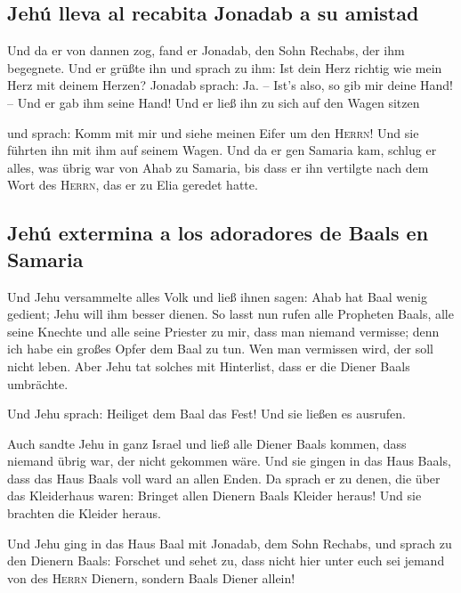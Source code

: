 \hypertarget{jehuxfa-lleva-al-recabita-jonadab-a-su-amistad}{%
\subsection{Jehú lleva al recabita Jonadab a su
amistad}\label{jehuxfa-lleva-al-recabita-jonadab-a-su-amistad}}

 Und da er von dannen zog, fand er Jonadab, den Sohn
Rechabs, der ihm begegnete. Und er grüßte ihn und sprach zu ihm: Ist
dein Herz richtig wie mein Herz mit deinem Herzen? Jonadab sprach: Ja.
-- Ist's also, so gib mir deine Hand! -- Und er gab ihm seine Hand! Und
er ließ ihn zu sich auf den Wagen sitzen

 und sprach: Komm mit mir und siehe meinen Eifer um den
\textsc{Herrn}! Und sie führten ihn mit ihm auf seinem Wagen.
 Und da er gen Samaria kam, schlug er alles, was übrig
war von Ahab zu Samaria, bis dass er ihn vertilgte nach dem Wort des
\textsc{Herrn}, das er zu Elia geredet hatte.

\hypertarget{jehuxfa-extermina-a-los-adoradores-de-baals-en-samaria}{%
\subsection{Jehú extermina a los adoradores de Baals en
Samaria}\label{jehuxfa-extermina-a-los-adoradores-de-baals-en-samaria}}

 Und Jehu versammelte alles Volk und ließ ihnen sagen:
Ahab hat Baal wenig gedient; Jehu will ihm besser dienen.
 So lasst nun rufen alle Propheten Baals, alle seine
Knechte und alle seine Priester zu mir, dass man niemand vermisse; denn
ich habe ein großes Opfer dem Baal zu tun. Wen man vermissen wird, der
soll nicht leben. Aber Jehu tat solches mit Hinterlist, dass er die
Diener Baals umbrächte.

 Und Jehu sprach: Heiliget dem Baal das Fest! Und sie
ließen es ausrufen.

 Auch sandte Jehu in ganz Israel und ließ alle Diener
Baals kommen, dass niemand übrig war, der nicht gekommen wäre. Und sie
gingen in das Haus Baals, dass das Haus Baals voll ward an allen Enden.
 Da sprach er zu denen, die über das Kleiderhaus waren:
Bringet allen Dienern Baals Kleider heraus! Und sie brachten die Kleider
heraus.

 Und Jehu ging in das Haus Baal mit Jonadab, dem Sohn
Rechabs, und sprach zu den Dienern Baals: Forschet und sehet zu, dass
nicht hier unter euch sei jemand von des \textsc{Herrn} Dienern, sondern
Baals Diener allein!

